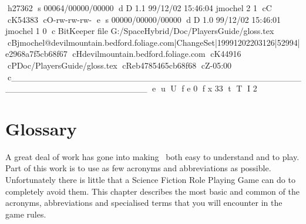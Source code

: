 h27362
s 00064/00000/00000
d D 1.1 99/12/02 15:46:04 jmochel 2 1
cC
cK54383
cO-rw-rw-rw-
e
s 00000/00000/00000
d D 1.0 99/12/02 15:46:01 jmochel 1 0
c BitKeeper file G:/SpaceHybrid/Doc/PlayersGuide/gloss.tex
cBjmochel@devilmountain.bedford.foliage.com|ChangeSet|19991202203126|52994|e2968a7f5cb68f67
cHdevilmountain.bedford.foliage.com
cK44916
cPDoc/PlayersGuide/gloss.tex
cReb4785465cb68f68
cZ-05:00
c______________________________________________________________________
e
u
U
f e 0
f x 33
t
T
I 2
\chapter{Glossary}

A great deal of work has gone into making \SH\ both
easy to understand and to play. Part of this work is to use as few 
acronyms and abbreviations as possible. Unfortunately there is little
that a Science Fiction Role Playing Game can do to completely avoid 
them. This chapter describes the most basic 
and common of the acronyms, abbreviations and specialised 
terms that you will encounter in the game rules. 

